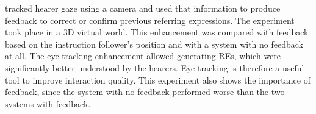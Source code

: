 \citet{koller2012enhancing} tracked hearer gaze using a camera and used that information to produce feedback to correct or confirm previous referring expressions. The experiment took place in a 3D virtual world. This enhancement was compared with feedback based on the instruction follower's position and with a system with no feedback at all. The eye-tracking enhancement allowed generating REs, which were significantly better understood by the hearers. Eye-tracking is therefore a useful tool to improve interaction quality. This experiment also shows the importance of feedback, since the system with no feedback performed worse than the two systems with feedback.